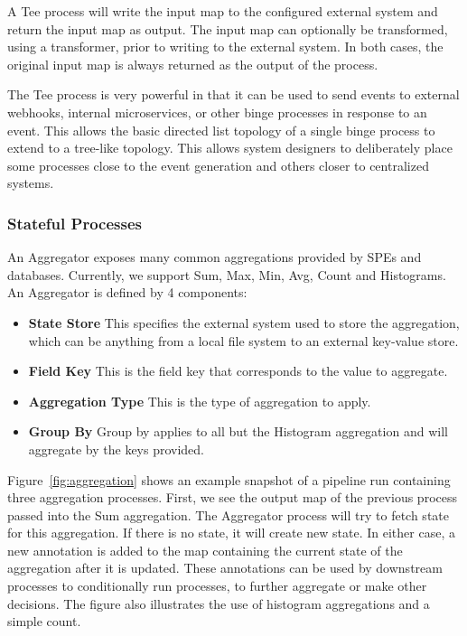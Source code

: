 \documentclass[10pt,twocolumn]{article}
\begin{document}
A Tee process will write the input map to the configured external system and
return the input map as output.  The input map can optionally be transformed,
using a transformer, prior to writing to the external system.  In both cases,
the original input map is always returned as the output of the process.  

The Tee process is very powerful in that it can be used to send events to
external webhooks, internal microservices, or other binge processes in response
to an event.  This allows the basic directed list topology of a single binge
process to extend to a tree-like topology.  This allows system designers to
deliberately place some processes close to the event generation and others
closer to centralized systems.

\subsubsection{Stateful Processes}

An Aggregator exposes many common aggregations provided by SPEs and databases.
Currently, we support Sum, Max, Min, Avg, Count and Histograms.  An Aggregator
is defined by 4 components:

\begin{itemize}
\item[]{\bfseries State Store} This specifies the external system used to store
the aggregation, which can be anything from a local file system to an external
key-value store.
\item[]{\bfseries Field Key} This is the field key that corresponds to the value to aggregate.
\item[]{\bfseries Aggregation Type} This is the type of aggregation to apply.
\item[]{\bfseries Group By} Group by applies to all but the Histogram aggregation and will aggregate by the keys provided.
\end{itemize}

Figure~\ref{fig:aggregation} shows an example snapshot of a pipeline run
containing three aggregation processes.  First, we see the output map of the
previous process passed into the Sum aggregation.  The Aggregator process will
try to fetch state for this aggregation.  If there is no state, it will create
new state.  In either case, a new annotation is added to the map containing the
current state of the aggregation after it is updated.  These annotations can be
used by downstream processes to conditionally run processes, to further
aggregate or make other decisions.  The figure also illustrates the use of
histogram aggregations and a simple count.
\end{document}
